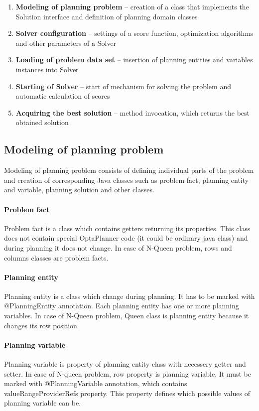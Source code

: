 \begin{enumerate}
\item \textbf{Modeling of planning problem} -- creation of a class that implements the Solution interface and definition of planning domain classes
\item \textbf{Solver configuration} -- settings of a score function, optimization algorithms and other parameters of a Solver
\item \textbf{Loading of problem data set} -- insertion of planning entities and variables instances into Solver
\item \textbf{Starting of Solver} -- start of mechanism for solving the problem and automatic calculation of scores
\item \textbf{Acquiring the best solution} -- method invocation, which returns the best obtained solution
\end{enumerate}

\subsection{Modeling of planning problem}
Modeling of planning problem consists of defining individual parts of the problem and creation of corresponding Java classes such as problem fact, planning entity and variable, planning solution and other classes.

\paragraph{Problem fact}
Problem fact is a class which contains getters returning its properties. This class does not contain special OptaPlanner code (it could be ordinary java class) and during planning it does not change. In case of N-Queen problem, rows and columns classes are problem facts.

\paragraph{Planning entity}
Planning entity is a class which change during planning. It has to be marked with @PlanningEntity annotation. Each planning entity has one or more planning variables. In case of N-Queen problem, Queen class is planning entity because it changes its row position.

\paragraph{Planning variable}
Planning variable is property of planning entity class with necessery getter and setter. In case of N-queen problem, row property is planning variable. It must be marked with @PlanningVariable annotation, which contains valueRangeProviderRefs property. This property defines which possible values of planning variable can be.


